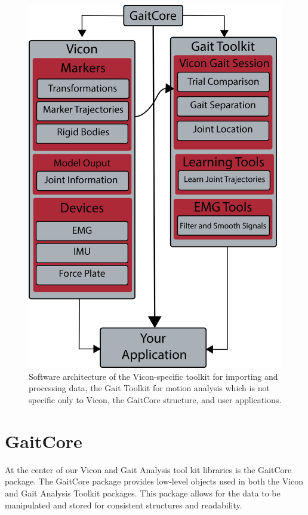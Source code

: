 \begin{figure}[hbt]
    \centering
    \includegraphics[scale=0.15]{images/software/software.png}
    \caption[Software Architecture]{Software architecture of the Vicon-specific toolkit for importing and processing data, the Gait Toolkit for motion analysis which is not specific only to Vicon, the GaitCore structure, and user applications.}
    \label{fig:software}
\end{figure}


\section{GaitCore}
At the center of our Vicon and Gait Analysis tool kit libraries is the GaitCore package. The GaitCore package provides low-level objects used in both the Vicon and Gait Analysis Toolkit packages. This package allows for the data to be manipulated and stored for consistent structures and readability.

